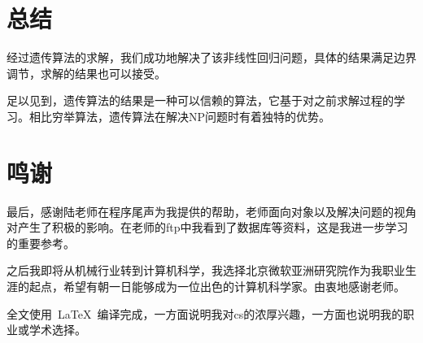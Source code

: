\documentclass[12pt]{article}
\begin{document}
\section{总结}
经过遗传算法的求解，我们成功地解决了该非线性回归问题，具体的结果满足边界调节，求解的结果也可以接受。\par
足以见到，遗传算法的结果是一种可以信赖的算法，它基于对之前求解过程的学习。相比穷举算法，遗传算法在解决NP问题时有着独特的优势。
\section{鸣谢}
最后，感谢陆老师在程序尾声为我提供的帮助，老师面向对象以及解决问题的视角对产生了积极的影响。在老师的ftp中我看到了数据库等资料，这是我进一步学习的重要参考。\par
之后我即将从机械行业转到计算机科学，我选择北京微软亚洲研究院作为我职业生涯的起点，希望有朝一日能够成为一位出色的计算机科学家。由衷地感谢老师。\par
全文使用~\LaTeX~编译完成，一方面说明我对cs的浓厚兴趣，一方面也说明我的职业或学术选择。
\end{document}
